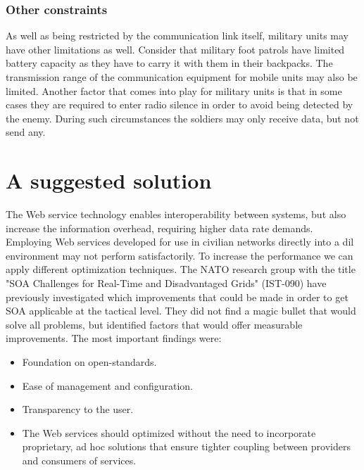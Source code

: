 \subsubsection{Other constraints}

As well as being restricted  by the communication link itself, military units
may have other limitations as well. Consider that military foot patrols have
limited battery capacity as they have to carry it with them in their
backpacks. The transmission range of the communication equipment for mobile
units may also be limited. Another factor that comes into play for military
units is that in some cases they are required to enter radio silence in order
to avoid being detected by the enemy. During such circumstances the soldiers
may only receive data, but not send any.

\section{A suggested solution}

The Web service technology enables interoperability between systems, but also
increase the information overhead, requiring higher data rate demands. Employing
Web services developed for use in civilian networks directly into a \gls{dil}
environment may not perform satisfactorily. To increase the performance we can
apply different optimization techniques. The NATO research group  with
the title "SOA Challenges for Real-Time and Disadvantaged Grids"\cite{ist-090} (IST-090)
have previously investigated which improvements that could be made in order to
get SOA applicable at the tactical level. They did not find a magic bullet that would solve all problems, but
identified factors that would offer measurable improvements. The most important
findings were:

\begin{itemize}
    \item Foundation on open-standards.
    \item Ease of management and configuration.
    \item Transparency to the user.
    \item The Web services should optimized without the need to incorporate proprietary, ad hoc solutions that ensure tighter coupling between providers and consumers of services.
\end{itemize}

